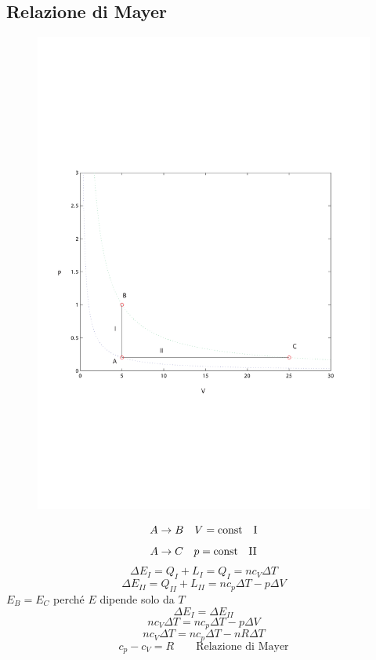\subsection{Relazione di Mayer}
\label{mayer}
\begin{figure}[!htbp]
\centering
\includegraphics[scale=0.5]{immagini/fisica1/pV2_win}
\end{figure}
$$A\rightarrow B\quad V=\text{const}\quad \text{I}$$
$$A\rightarrow C\quad p=\text{const}\quad \text{II}$$
$$\Delta E_I=Q_I+L_I=Q_I=nc_V\Delta T$$
$$\Delta E_{II}=Q_{II}+L_{II}=nc_p\Delta T-p\Delta V$$
$E_B=E_C$ perché $E$ dipende solo da $T$
$$\Delta E_I=\Delta E_{II}$$
$$nc_V\Delta T=nc_p\Delta T-p\Delta V$$
$$nc_V\Delta T=nc_p\Delta T-nR\Delta T$$
\begin{equation}
c_p-c_V=R\qquad\text{Relazione di Mayer}
\end{equation}

